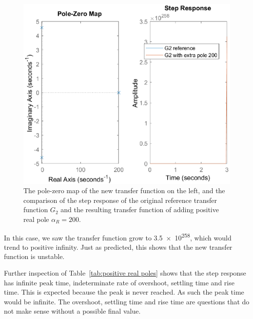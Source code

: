 \documentclass[12pt]{article}
\begin{document}
\begin{figure}
    \centering
    \includegraphics{img/part02_positive_real_pole.eps}
    \caption{The pole-zero map of the new transfer function on the left, and the comparison of the step response of the original reference transfer function $G_2$ and the resulting transfer function of adding positive real pole $\alpha_R = 200$.}
    \label{fig:positive real poles}
\end{figure}

In this case, we saw the transfer function grow to \num{3.5e+258}, which would trend to positive infinity. Just as predicted, this shows that the new transfer function is unstable.

Further inspection of Table~\ref{tab:positive real poles} shows that the step response has infinite peak time, indeterminate rate of overshoot, settling time and rise time. This is expected because the peak is never reached. As such the peak time would be infinite. The overshoot, settling time and rise time are questions that do not make sense without a possible final value.
\end{document}
